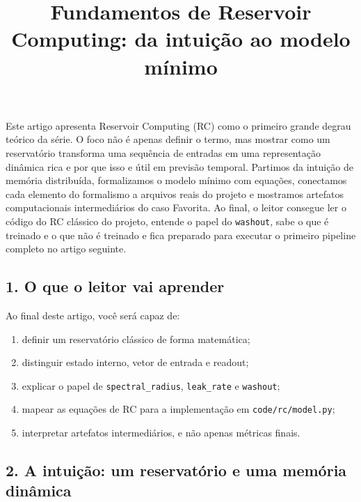 \documentclass[12pt]{article}
\title{Fundamentos de Reservoir Computing: da intuição ao modelo mínimo}
\author{}
\providecommand{\tightlist}{%
          \setlength{\itemsep}{0pt}\setlength{\parskip}{0pt}}
\begin{document}
        \maketitle

        \begin{resumo}
        Este artigo apresenta Reservoir Computing (RC) como o primeiro grande degrau teórico da série. O foco não é apenas definir o termo, mas mostrar como um reservatório transforma uma sequência de entradas em uma representação dinâmica rica e por que isso e útil em previsão temporal. Partimos da intuição de memória distribuída, formalizamos o modelo mínimo com equações, conectamos cada elemento do formalismo a arquivos reais do projeto e mostramos artefatos computacionais intermediários do caso Favorita. Ao final, o leitor consegue ler o código do RC clássico do projeto, entende o papel do \texttt{washout}, sabe o que é treinado e o que não é treinado e fica preparado para executar o primeiro pipeline completo no artigo seguinte.
        \end{resumo}

        \subsection{1. O que o leitor vai aprender}\label{1-o-que-o-leitor-vai-aprender}

Ao final deste artigo, você será capaz de:

\begin{enumerate}
\def\labelenumi{\arabic{enumi}.}
\tightlist
\item
  definir um reservatório clássico de forma matemática;
\item
  distinguir estado interno, vetor de entrada e readout;
\item
  explicar o papel de \texttt{spectral\_radius}, \texttt{leak\_rate} e \texttt{washout};
\item
  mapear as equações de RC para a implementação em \texttt{code/rc/model.py};
\item
  interpretar artefatos intermediários, e não apenas métricas finais.
\end{enumerate}

\subsection{2. A intuição: um reservatório e uma memória dinâmica}\label{2-a-intuiuxe7uxe3o-um-reservatuxf3rio-e-uma-memuxf3ria-dinuxe2mica}
\end{document}
